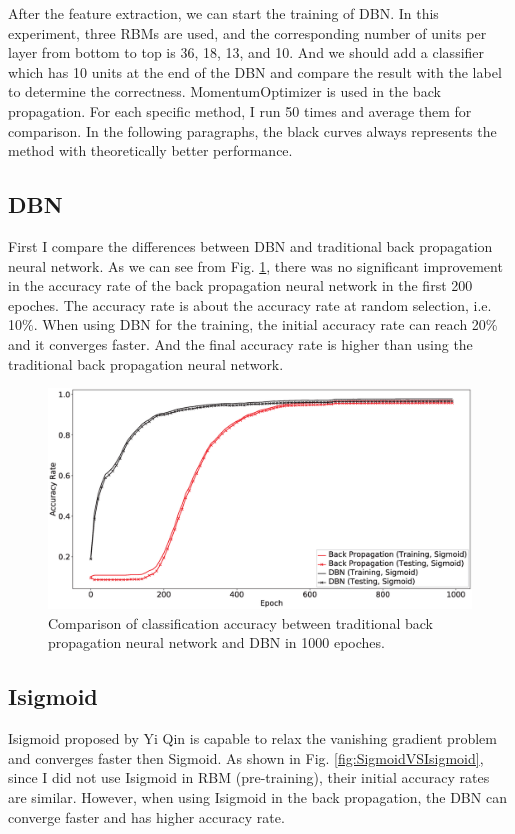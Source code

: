 \documentclass{bioinfo}
\begin{document}
After the feature extraction, we can start the training of DBN. In this experiment, three RBMs are used, and the corresponding number of units per layer from bottom to top is 36, 18, 13, and 10. And we should add a classifier which has 10 units at the end of the DBN and compare the result with the label to determine the correctness. MomentumOptimizer is used in the back propagation. For each specific method, I run 50 times and average them for comparison. In the following paragraphs, the black curves always represents the method with theoretically better performance.

\subsection{DBN}
First I compare the differences between DBN and traditional back propagation neural network. As we can see from Fig. \ref{fig:dbnVSbp}, there was no significant improvement in the accuracy rate of the back propagation neural network in the first 200 epoches. The accuracy rate is about the accuracy rate at random selection, i.e. 10\%. When using DBN for the training, the initial accuracy rate can reach 20\% and it converges faster. And the final accuracy rate is higher than using the traditional back propagation neural network.

\begin{figure}[htbp]
	\centering
	\includegraphics[width=\columnwidth]{dbnVSbp.eps}
	\caption{Comparison of classification accuracy between traditional back propagation neural network and DBN in 1000 epoches.}
	\label{fig:dbnVSbp}
\end{figure}

\subsection{Isigmoid}
Isigmoid proposed by Yi Qin \cite{YiThe} is capable to relax the vanishing gradient problem and converges faster then Sigmoid. As shown in Fig. \ref{fig:SigmoidVSIsigmoid}, since I did not use Isigmoid in RBM (pre-training), their initial accuracy rates are similar. However, when using Isigmoid in the back propagation, the DBN can converge faster and has higher accuracy rate.
\end{document}
